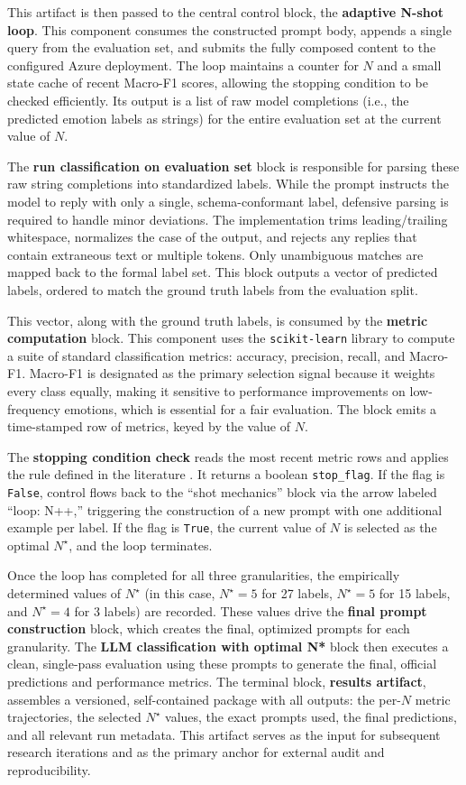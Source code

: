 This artifact is then passed to the central control block, the \textbf{adaptive N-shot loop}. This component consumes the constructed prompt body, appends a single query from the evaluation set, and submits the fully composed content to the configured Azure deployment. The loop maintains a counter for $N$ and a small state cache of recent Macro-F1 scores, allowing the stopping condition to be checked efficiently. Its output is a list of raw model completions (i.e., the predicted emotion labels as strings) for the entire evaluation set at the current value of $N$.

The \textbf{run classification on evaluation set} block is responsible for parsing these raw string completions into standardized labels. While the prompt instructs the model to reply with only a single, schema-conformant label, defensive parsing is required to handle minor deviations. The implementation trims leading/trailing whitespace, normalizes the case of the output, and rejects any replies that contain extraneous text or multiple tokens. Only unambiguous matches are mapped back to the formal label set. This block outputs a vector of predicted labels, ordered to match the ground truth labels from the evaluation split.

This vector, along with the ground truth labels, is consumed by the \textbf{metric computation} block. This component uses the \texttt{scikit-learn} library to compute a suite of standard classification metrics: accuracy, precision, recall, and Macro-F1. Macro-F1 is designated as the primary selection signal because it weights every class equally, making it sensitive to performance improvements on low-frequency emotions, which is essential for a fair evaluation. The block emits a time-stamped row of metrics, keyed by the value of $N$.

The \textbf{stopping condition check} reads the most recent metric rows and applies the rule defined in the literature \cite{zhu2020stopping}. It returns a boolean \texttt{stop\_flag}. If the flag is \texttt{False}, control flows back to the ``shot mechanics'' block via the arrow labeled ``loop: N++,'' triggering the construction of a new prompt with one additional example per label. If the flag is \texttt{True}, the current value of $N$ is selected as the optimal $N^{\star}$, and the loop terminates.

Once the loop has completed for all three granularities, the empirically determined values of $N^{\star}$ (in this case, $N^{\star}=5$ for 27 labels, $N^{\star}=5$ for 15 labels, and $N^{\star}=4$ for 3 labels) are recorded. These values drive the \textbf{final prompt construction} block, which creates the final, optimized prompts for each granularity. The \textbf{LLM classification with optimal N*} block then executes a clean, single-pass evaluation using these prompts to generate the final, official predictions and performance metrics. The terminal block, \textbf{results artifact}, assembles a versioned, self-contained package with all outputs: the per-$N$ metric trajectories, the selected $N^{\star}$ values, the exact prompts used, the final predictions, and all relevant run metadata. This artifact serves as the input for subsequent research iterations and as the primary anchor for external audit and reproducibility.
